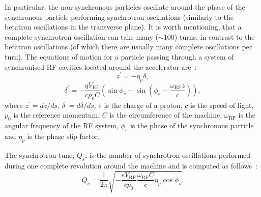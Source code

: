  In particular, the non-synchronous particles oscillate around the phase of the synchronous particle performing synchrotron oscillations (similarly to the betatron oscillations in the transverse plane). It is worth mentioning, that a complete synchrotron oscillation can take many ($\sim$100) turns, in contrast to the betatron oscillations (of which there are usually many complete oscillations per turn). The equations of motion for a particle passing through a system of synchronised RF cavities located around the accelerator are~\cite{wolski2014}: %
\begin{equation}\label{eq:long_eq_motion_z}
    z^\prime = - \eta_p \delta,
\end{equation}
\begin{equation}\label{eq:long_eq_motion_delta}
    \delta^\prime = - \frac{qV_\mathrm{RF}}{c p_0 C} \left ( \sin{\phi_s} - \sin{\left ( \phi_s - \frac{\omega_\mathrm{RF} z}{c} \right)} \right ),
\end{equation}
where $z^\prime = dz/ds$, $\delta^\prime = d\delta/ds$, $e$ is the charge of a proton, $c$ is the speed of light, $p_0$ is the reference momentum, $C$ is the circumference of the machine, $\omega_\mathrm{RF}$ is the angular frequency of the RF system, $\phi_s$ is the phase of the synchronous particle and $\eta_p$ is the phase slip factor.

The synchrotron tune, $Q_s$, is the number of synchrotron oscillations performed during one complete revolution around the machine and is computed as follows~\cite{wolski2014}: %
\begin{equation}\label{eq:Qs} 
    Q_s = \frac{1}{2\pi}\sqrt{-\frac{e V_\mathrm{RF}}{c p_0} \frac{\omega_\mathrm{RF} C}{c} \eta_p \cos{\phi_s}}.
\end{equation}

